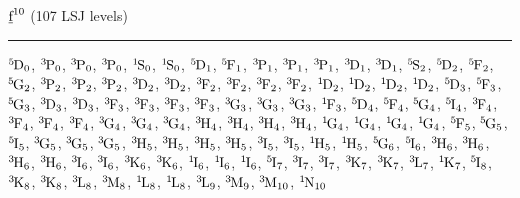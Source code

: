 \begin{mdframed}
\begin{center}
$\forb^{10}$
(107 LSJ levels)
\vspace{0.25cm}
\hrule
\vspace{0.25cm}

$\LSJterm{5}{D}{0}$, $\LSJterm{3}{P}{0}$, $\LSJterm{3}{P}{0}$, $\LSJterm{3}{P}{0}$, $\LSJterm{1}{S}{0}$, $\LSJterm{1}{S}{0}$, $\LSJterm{5}{D}{1}$, $\LSJterm{5}{F}{1}$, $\LSJterm{3}{P}{1}$, $\LSJterm{3}{P}{1}$, $\LSJterm{3}{P}{1}$, $\LSJterm{3}{D}{1}$, $\LSJterm{3}{D}{1}$, $\LSJterm{5}{S}{2}$, $\LSJterm{5}{D}{2}$, $\LSJterm{5}{F}{2}$, $\LSJterm{5}{G}{2}$, $\LSJterm{3}{P}{2}$, $\LSJterm{3}{P}{2}$, $\LSJterm{3}{P}{2}$, $\LSJterm{3}{D}{2}$, $\LSJterm{3}{D}{2}$, $\LSJterm{3}{F}{2}$, $\LSJterm{3}{F}{2}$, $\LSJterm{3}{F}{2}$, $\LSJterm{3}{F}{2}$, $\LSJterm{1}{D}{2}$, $\LSJterm{1}{D}{2}$, $\LSJterm{1}{D}{2}$, $\LSJterm{1}{D}{2}$, $\LSJterm{5}{D}{3}$, $\LSJterm{5}{F}{3}$, $\LSJterm{5}{G}{3}$, $\LSJterm{3}{D}{3}$, $\LSJterm{3}{D}{3}$, $\LSJterm{3}{F}{3}$, $\LSJterm{3}{F}{3}$, $\LSJterm{3}{F}{3}$, $\LSJterm{3}{F}{3}$, $\LSJterm{3}{G}{3}$, $\LSJterm{3}{G}{3}$, $\LSJterm{3}{G}{3}$, $\LSJterm{1}{F}{3}$, $\LSJterm{5}{D}{4}$, $\LSJterm{5}{F}{4}$, $\LSJterm{5}{G}{4}$, $\LSJterm{5}{I}{4}$, $\LSJterm{3}{F}{4}$, $\LSJterm{3}{F}{4}$, $\LSJterm{3}{F}{4}$, $\LSJterm{3}{F}{4}$, $\LSJterm{3}{G}{4}$, $\LSJterm{3}{G}{4}$, $\LSJterm{3}{G}{4}$, $\LSJterm{3}{H}{4}$, $\LSJterm{3}{H}{4}$, $\LSJterm{3}{H}{4}$, $\LSJterm{3}{H}{4}$, $\LSJterm{1}{G}{4}$, $\LSJterm{1}{G}{4}$, $\LSJterm{1}{G}{4}$, $\LSJterm{1}{G}{4}$, $\LSJterm{5}{F}{5}$, $\LSJterm{5}{G}{5}$, $\LSJterm{5}{I}{5}$, $\LSJterm{3}{G}{5}$, $\LSJterm{3}{G}{5}$, $\LSJterm{3}{G}{5}$, $\LSJterm{3}{H}{5}$, $\LSJterm{3}{H}{5}$, $\LSJterm{3}{H}{5}$, $\LSJterm{3}{H}{5}$, $\LSJterm{3}{I}{5}$, $\LSJterm{3}{I}{5}$, $\LSJterm{1}{H}{5}$, $\LSJterm{1}{H}{5}$, $\LSJterm{5}{G}{6}$, $\LSJterm{5}{I}{6}$, $\LSJterm{3}{H}{6}$, $\LSJterm{3}{H}{6}$, $\LSJterm{3}{H}{6}$, $\LSJterm{3}{H}{6}$, $\LSJterm{3}{I}{6}$, $\LSJterm{3}{I}{6}$, $\LSJterm{3}{K}{6}$, $\LSJterm{3}{K}{6}$, $\LSJterm{1}{I}{6}$, $\LSJterm{1}{I}{6}$, $\LSJterm{1}{I}{6}$, $\LSJterm{5}{I}{7}$, $\LSJterm{3}{I}{7}$, $\LSJterm{3}{I}{7}$, $\LSJterm{3}{K}{7}$, $\LSJterm{3}{K}{7}$, $\LSJterm{3}{L}{7}$, $\LSJterm{1}{K}{7}$, $\LSJterm{5}{I}{8}$, $\LSJterm{3}{K}{8}$, $\LSJterm{3}{K}{8}$, $\LSJterm{3}{L}{8}$, $\LSJterm{3}{M}{8}$, $\LSJterm{1}{L}{8}$, $\LSJterm{1}{L}{8}$, $\LSJterm{3}{L}{9}$, $\LSJterm{3}{M}{9}$, $\LSJterm{3}{M}{10}$, $\LSJterm{1}{N}{10}$
\end{center}
\end{mdframed}


